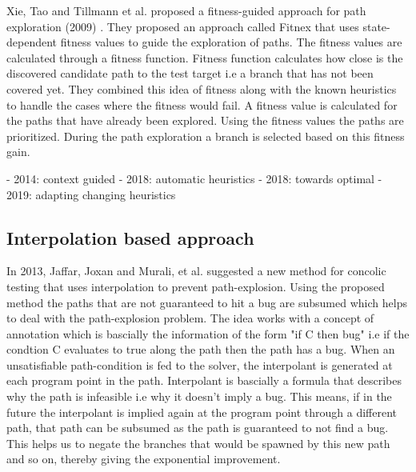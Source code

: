 \documentclass[	runningheads,
				a4paper]{llncs}
\begin{document}
Xie, Tao and Tillmann et al. proposed a fitness-guided approach for path exploration (2009) \cite{xie2009fitness}. They proposed an approach called Fitnex that uses state-dependent fitness values to guide the exploration of paths. The fitness values are calculated through a fitness function. Fitness function calculates how close is the discovered candidate path to the test target i.e a branch that has not been covered yet. They combined this idea of fitness along with the known heuristics to handle the cases where the fitness would fail. A fitness value is calculated for the paths that have already been explored. Using the fitness values the paths are prioritized. During the path exploration a branch is selected based on this fitness gain. 

- 2014: context guided
- 2018: automatic heuristics
- 2018: towards optimal 
- 2019: adapting changing heuristics


\subsection{Interpolation based approach}
In 2013, Jaffar, Joxan and Murali, et al. suggested a new method \cite{jaffar2013boosting} for concolic testing that uses interpolation to prevent path-explosion. Using the proposed method the paths that are not guaranteed to hit a bug are subsumed which helps to deal with the path-explosion problem. The idea works with a concept of annotation which is bascially the  information of the form "if C then bug" i.e if the condtion C evaluates to true along the path then the path has a bug. When an unsatisfiable path-condition is fed to the solver, the interpolant is generated at each program point in the path. Interpolant is bascially a formula that describes why the path is infeasible i.e why it doesn't imply a bug. This means, if in the future the interpolant is implied again at the program point through a different path, that path can be subsumed as the path is guaranteed to not find a bug. This helps us to negate the branches that would be spawned by this new path and so on, thereby giving the exponential improvement.
\end{document}
